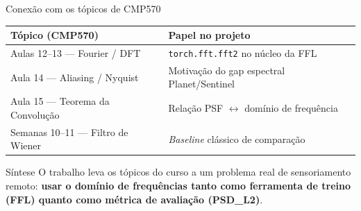 \documentclass[aspectratio=169]{beamer}
\begin{document}
\begin{frame}{Conexão com os tópicos de CMP570}

  \begin{center}
  \begin{tabular}{ll}
    \toprule
    \textbf{Tópico (CMP570)} & \textbf{Papel no projeto} \\
    \midrule
    Aulas 12--13 — Fourier / DFT      & \texttt{torch.fft.fft2} no núcleo da FFL \\
    Aula 14 — Aliasing / Nyquist      & Motivação do gap espectral Planet/Sentinel \\
    Aula 15 — Teorema da Convolução   & Relação PSF $\leftrightarrow$ domínio de frequência \\
    Semanas 10--11 — Filtro de Wiener & \textit{Baseline} clássico de comparação \\
    \bottomrule
  \end{tabular}
  \end{center}

  \vspace{1em}
  \begin{block}{Síntese}
    O trabalho leva os tópicos do curso a um problema real de sensoriamento
    remoto: \textbf{usar o domínio de frequências tanto como ferramenta de
    treino (FFL) quanto como métrica de avaliação (PSD\_L2)}.
  \end{block}

\end{frame}
\end{document}

